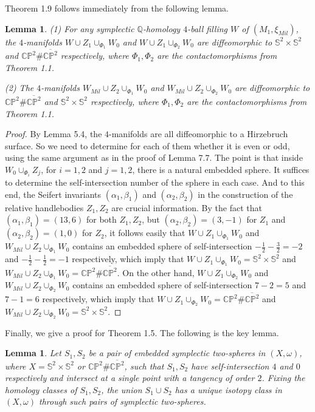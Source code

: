 \documentclass[11pt]{amsart}
\theoremstyle{plain}
\numberwithin{theorem}{section}
\newtheorem{lemma}[theorem]{Lemma}
\theoremstyle{definition}
\newcommand{\C}{{\mathbb C}}
\newcommand{\Q}{{\mathbb Q}}
\renewcommand{\P}{{\mathbb P}}
\newcommand{\s}{{\mathbb S}}
\begin{document}
Theorem 1.9 follows immediately from the following lemma. 

\begin{lemma}
(1) For any symplectic $\Q$-homology $4$-ball filling $W$ of $(M_1,\xi_{Mil})$, the $4$-manifolds $W\cup Z_1\cup_{\Phi_1} W_0$ and $W\cup Z_1\cup_{\Phi_2} W_0$ are diffeomorphic to $\s^2\times \s^2$  
and $\C\P^2\# \overline{\C\P^2}$ respectively, where $\Phi_1,\Phi_2$ are the contactomorphisms 
from Theorem 1.1.

(2) The $4$-manifolds $W_{Mil}\cup Z_2\cup_{\Phi_1} W_0$ and $W_{Mil}\cup Z_2\cup_{\Phi_2} W_0$ are diffeomorphic to $\C\P^2\# \overline{\C\P^2}$ and $\s^2\times \s^2$ respectively, where $\Phi_1,\Phi_2$ are the contactomorphisms from Theorem 1.1.
\end{lemma}

\begin{proof}
By Lemma 5.4, the $4$-manifolds are all diffeomorphic to a Hirzebruch surface. So we need to determine for each of them whether it is even or odd, using the same argument as in the proof of Lemma 7.7. The point is that inside 
$W_0\cup_{\Phi_i} Z_j$, for $i=1,2$ and $j=1,2$, there is a natural embedded sphere. It suffices to determine the self-intersection number of the sphere in each case. And to this end, the Seifert invariants $(\alpha_1,\beta_1)$
and $(\alpha_2,\beta_2)$ in the construction of the relative handlebodies $Z_1,Z_2$ are crucial information. By the fact that $(\alpha_1,\beta_1)=(13,6)$ for both $Z_1,Z_2$, but $(\alpha_2,\beta_2)=(3,-1)$ for $Z_1$ and
$(\alpha_2,\beta_2)=(1,0)$ for $Z_2$, it follows easily that $W\cup Z_1\cup_{\Phi_1} W_0$ and $W_{Mil}\cup Z_2\cup_{\Phi_1} W_0$ contains an embedded sphere of self-intersection $-\frac{1}{2}-\frac{3}{2}=-2$ and
$-\frac{1}{2}-\frac{1}{2}=-1$ respectively, which imply that $W\cup Z_1\cup_{\Phi_1} W_0=\s^2\times \s^2$ and
$W_{Mil}\cup Z_2\cup_{\Phi_1} W_0=\C\P^2\# \overline{\C\P^2}$. On the other hand, 
$W\cup Z_1\cup_{\Phi_2} W_0$ and $W_{Mil}\cup Z_2\cup_{\Phi_2} W_0$ contains an embedded sphere of
self-intersection $7-2=5$ and $7-1=6$ respectively, which imply that $W\cup Z_1\cup_{\Phi_2} W_0=\C\P^2\# \overline{\C\P^2}$ and $W_{Mil}\cup Z_2\cup_{\Phi_2} W_0=\s^2\times \s^2$. 

\end{proof}

Finally, we give a proof for Theorem 1.5. The following is the key lemma. 

\begin{lemma}
Let $S_1,S_2$ be a pair of embedded symplectic two-spheres in $(X,\omega)$, where $X=\s^2\times \s^2$ or 
$\C\P^2\#\overline{\C\P^2}$, such that $S_1,S_2$ have self-intersection $4$ and $0$ respectively and intersect at a single point with a tangency of order $2$. Fixing the homology classes of $S_1,S_2$, the union $S_1\cup S_2$ has a unique isotopy class in $(X,\omega)$ through such pairs of symplectic two-spheres.
\end{lemma}
\end{document}
